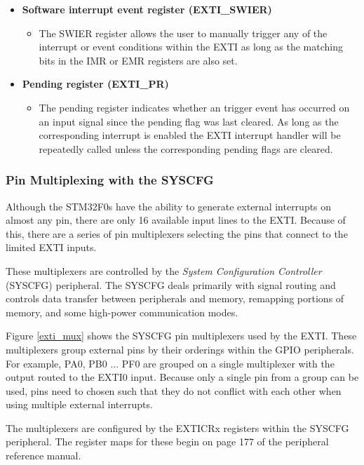 \documentclass[11pt,fleqn]{book} %
\begin{document}
\begin{itemize}
    \item \textbf{Software interrupt event register (EXTI\_SWIER)}
    \begin{itemize}
        \item The SWIER register allows the user to manually trigger any of the interrupt or event conditions within the EXTI as long as the matching bits in the IMR or EMR registers are also set. 
    \end{itemize}
    \item \textbf{Pending register (EXTI\_PR)}
    \begin{itemize}
        \item  The pending register indicates whether an trigger event has occurred on an input signal since the pending flag was last cleared. As long as the corresponding interrupt is enabled the EXTI interrupt handler will be repeatedly called unless the corresponding pending flags are cleared. 
    \end{itemize}
\end{itemize}



\subsubsection{Pin Multiplexing with the SYSCFG}
Although the STM32F0s have the ability to generate external interrupts on almost any pin, there are only 16 available input lines to the EXTI. Because of this, there are a series of pin multiplexers selecting the pins that connect to the limited EXTI inputs.  

These multiplexers are controlled by the \textit{System Configuration Controller} (SYSCFG) peripheral. The SYSCFG deals primarily with signal routing and controls data transfer between peripherals and memory, remapping portions of memory, and some high-power communication modes. 

Figure \ref{exti_mux} shows the SYSCFG pin multiplexers used by the EXTI. These multiplexers group external pins by their orderings within the GPIO peripherals. For example, PA0, PB0 ... PF0 are grouped on a single multiplexer with the output routed to the EXTI0 input. Because only a single pin from a group can be used, pins need to chosen such that they do not conflict with each other when using multiple external interrupts.

The multiplexers are configured by the EXTICRx registers within the SYSCFG peripheral. The register maps for these begin on page 177 of the peripheral reference manual. 
\end{document}
